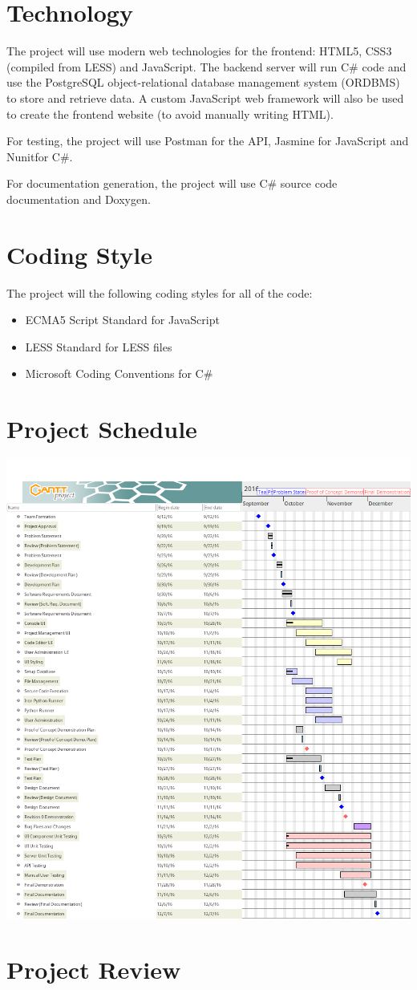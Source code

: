 \documentclass{article}
\begin{document}
\section{Technology}
The project will use modern web technologies for the frontend: HTML5, CSS3
(compiled from LESS) and JavaScript. The backend server will run C\# code and
use the PostgreSQL object-relational database management system (ORDBMS) to
store and retrieve data. A custom JavaScript web framework will also be used to
create the frontend website (to avoid manually writing HTML).

For testing, the project will use Postman for the API, Jasmine for JavaScript
and Nunitfor C\#.

For documentation generation, the project will use C\# source code
documentation and Doxygen.

\section{Coding Style}
The project will the following coding styles for all of the code:
\begin{itemize}
  \item ECMA5 Script Standard for JavaScript
  \item LESS Standard for LESS files
  \item Microsoft Coding Conventions for C\#
\end{itemize}

\section{Project Schedule}

\includegraphics[width=\textwidth]{../ProjectSchedule/schedule}

\section{Project Review}
\end{document}
